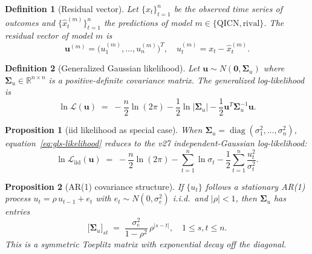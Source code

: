\documentclass[11pt]{article}
\newtheorem{definition}{Definition}
\newtheorem{proposition}{Proposition}
\begin{document}
\begin{definition}[Residual vector]
Let $\{x_t\}_{t=1}^n$ be the observed time series of outcomes and $\{\hat{x}_t^{(m)}\}_{t=1}^n$ the predictions of model $m\in\{\text{QICN},\text{rival}\}$. The \emph{residual vector} of model $m$ is
\[
\bm{u}^{(m)}=\bigl(u_1^{(m)},\ldots,u_n^{(m)}\bigr)^T,\quad u_t^{(m)}=x_t-\hat{x}_t^{(m)}.
\]
\end{definition}

\begin{definition}[Generalized Gaussian likelihood]
Let $\bm{u}\sim N(\bm{0},\bm{\Sigma}_u)$ where $\bm{\Sigma}_u\in\mathbb{R}^{n\times n}$ is a positive-definite covariance matrix. The \emph{generalized log-likelihood} is
\begin{equation}\label{eq:gls-likelihood}
\ln\mathcal{L}(\bm{u})\;=\;-\frac{n}{2}\ln(2\pi)-\frac{1}{2}\ln|\bm{\Sigma}_u|-\frac{1}{2}\bm{u}^T\bm{\Sigma}_u^{-1}\bm{u}.
\end{equation}
\end{definition}

\begin{proposition}[iid likelihood as special case]
When $\bm{\Sigma}_u=\operatorname{diag}(\sigma_1^2,\ldots,\sigma_n^2)$, equation~\eqref{eq:gls-likelihood} reduces to the v27 independent-Gaussian log-likelihood:
\[
\ln\mathcal{L}_{\mathrm{iid}}(\bm{u})\;=\;-\frac{n}{2}\ln(2\pi)-\sum_{t=1}^n\ln\sigma_t-\frac{1}{2}\sum_{t=1}^n\frac{u_t^2}{\sigma_t^2}.
\]
\end{proposition}

\begin{proposition}[AR(1) covariance structure]\label{prop:ar1-cov}
If $\{u_t\}$ follows a stationary AR(1) process $u_t=\rho\,u_{t-1}+e_t$ with $e_t\sim N(0,\sigma_e^2)$ i.i.d.\ and $|\rho|<1$, then $\bm{\Sigma}_u$ has entries
\[
\bigl[\bm{\Sigma}_u\bigr]_{st}\;=\;\frac{\sigma_e^2}{1-\rho^2}\,\rho^{|s-t|},\quad 1\leq s,t\leq n.
\]
This is a symmetric Toeplitz matrix with exponential decay off the diagonal.
\end{proposition}
\end{document}
